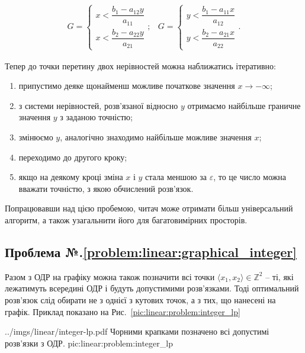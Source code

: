 \documentclass[\main/book.tex]{subfiles}
\begin{document}
\[
 \begin{array}{ll}
 G = \left\{
  \begin{array}{l}
   x < \dfrac{b_1 - a_{12} y}{a_{11}} \\
   x < \dfrac{b_2 - a_{22} y}{a_{21}}
  \end{array}
 \right.;
 &
 G = \left\{
  \begin{array}{l}
   y < \dfrac{b_1 - a_{11} x}{a_{12}} \\
   y < \dfrac{b_2 - a_{21} x}{a_{22}}
  \end{array}
 \right..
 \end{array}
\]

Тепер до точки перетину двох нерівностей можна наближатись ітеративно:

\begin{enumerate}
 \item припустимо деяке щонайменш можливе початкове значення ${x \to -\infty}$;
 \item з системи нерівностей, розв'язаної відносно $y$ отримаємо найбільше граничне значення $y$ з заданою точністю;
 \item змінюємо $y$, аналогічно знаходимо найбільше можливе значення $x$;
 \item переходимо до другого кроку;
 \item якщо на деякому кроці зміна $x$ і $y$ стала меншою за $\varepsilon$, то це число можна вважати точністю, з якою обчислений розв'язок.
\end{enumerate}

Попрацювавши над цією пробемою, читач може отримати більш універсальний алгоритм, а також узагальнити його для багатовимірних просторів.

\subsection*{Проблема №.\ref{problem:linear:graphical_integer}}

Разом з ОДР на графіку можна також позначити всі точки $\langle x_1, x_2 \rangle \in \mathbb{Z}^2$ -- ті, які лежатимуть всередині ОДР і будуть допустимими розв'язками. Тоді оптимальний розв'язок слід обирати не з однієї з кутових точок, а з тих, що нанесені на графік. Приклад показано на Рис.~\ref{pic:linear:problem:integer_lp}

\illustration
 {../imgs/linear/integer-lp.pdf}
 {Чорними крапками позначено всі допустимі розв'язки з ОДР.}
 {pic:linear:problem:integer_lp}
\end{document}
